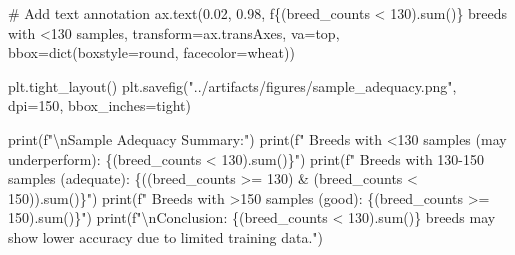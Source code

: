 \documentclass[
  letterpaper,
  DIV=11,
  numbers=noendperiod]{scrartcl}
\newenvironment{Shaded}{\begin{snugshade}}{\end{snugshade}}
\newcommand{\BuiltInTok}[1]{\textcolor[rgb]{0.00,0.23,0.31}{#1}}
\newcommand{\CharTok}[1]{\textcolor[rgb]{0.13,0.47,0.30}{#1}}
\newcommand{\CommentTok}[1]{\textcolor[rgb]{0.37,0.37,0.37}{#1}}
\newcommand{\DecValTok}[1]{\textcolor[rgb]{0.68,0.00,0.00}{#1}}
\newcommand{\FloatTok}[1]{\textcolor[rgb]{0.68,0.00,0.00}{#1}}
\newcommand{\NormalTok}[1]{\textcolor[rgb]{0.00,0.23,0.31}{#1}}
\newcommand{\OperatorTok}[1]{\textcolor[rgb]{0.37,0.37,0.37}{#1}}
\newcommand{\SpecialCharTok}[1]{\textcolor[rgb]{0.37,0.37,0.37}{#1}}
\newcommand{\SpecialStringTok}[1]{\textcolor[rgb]{0.13,0.47,0.30}{#1}}
\newcommand{\StringTok}[1]{\textcolor[rgb]{0.13,0.47,0.30}{#1}}
\renewenvironment{Shaded}{%
  \begin{tcolorbox}[%
    enhanced,%
    colback=codebg,%
    colframe=codebg,%
    borderline west={3pt}{0pt}{sectionblue},%
    boxrule=0pt,%
    arc=0pt,%
    boxsep=5pt,%
    left=2mm,%
    right=2mm,%
    top=2mm,%
    bottom=2mm%
  ]%
}{%
  \end{tcolorbox}%
}
\begin{document}
\begin{Shaded}
\begin{Highlighting}[]
\CommentTok{\# Add text annotation}
\NormalTok{ax.text(}\FloatTok{0.02}\NormalTok{, }\FloatTok{0.98}\NormalTok{, }\SpecialStringTok{f\textquotesingle{}}\SpecialCharTok{\{}\NormalTok{(breed\_counts }\OperatorTok{\textless{}} \DecValTok{130}\NormalTok{)}\SpecialCharTok{.}\BuiltInTok{sum}\NormalTok{()}\SpecialCharTok{\}}\SpecialStringTok{ breeds with \textless{}130 samples\textquotesingle{}}\NormalTok{, }
\NormalTok{        transform}\OperatorTok{=}\NormalTok{ax.transAxes, va}\OperatorTok{=}\StringTok{\textquotesingle{}top\textquotesingle{}}\NormalTok{, bbox}\OperatorTok{=}\BuiltInTok{dict}\NormalTok{(boxstyle}\OperatorTok{=}\StringTok{\textquotesingle{}round\textquotesingle{}}\NormalTok{, facecolor}\OperatorTok{=}\StringTok{\textquotesingle{}wheat\textquotesingle{}}\NormalTok{))}

\NormalTok{plt.tight\_layout()}
\NormalTok{plt.savefig(}\StringTok{"../artifacts/figures/sample\_adequacy.png"}\NormalTok{, dpi}\OperatorTok{=}\DecValTok{150}\NormalTok{, bbox\_inches}\OperatorTok{=}\StringTok{\textquotesingle{}tight\textquotesingle{}}\NormalTok{)}

\BuiltInTok{print}\NormalTok{(}\SpecialStringTok{f"}\CharTok{\textbackslash{}n}\SpecialStringTok{Sample Adequacy Summary:"}\NormalTok{)}
\BuiltInTok{print}\NormalTok{(}\SpecialStringTok{f"  Breeds with \textless{}130 samples (may underperform): }\SpecialCharTok{\{}\NormalTok{(breed\_counts }\OperatorTok{\textless{}} \DecValTok{130}\NormalTok{)}\SpecialCharTok{.}\BuiltInTok{sum}\NormalTok{()}\SpecialCharTok{\}}\SpecialStringTok{"}\NormalTok{)}
\BuiltInTok{print}\NormalTok{(}\SpecialStringTok{f"  Breeds with 130{-}150 samples (adequate): }\SpecialCharTok{\{}\NormalTok{((breed\_counts }\OperatorTok{\textgreater{}=} \DecValTok{130}\NormalTok{) }\OperatorTok{\&}\NormalTok{ (breed\_counts }\OperatorTok{\textless{}} \DecValTok{150}\NormalTok{))}\SpecialCharTok{.}\BuiltInTok{sum}\NormalTok{()}\SpecialCharTok{\}}\SpecialStringTok{"}\NormalTok{)}
\BuiltInTok{print}\NormalTok{(}\SpecialStringTok{f"  Breeds with \textgreater{}150 samples (good): }\SpecialCharTok{\{}\NormalTok{(breed\_counts }\OperatorTok{\textgreater{}=} \DecValTok{150}\NormalTok{)}\SpecialCharTok{.}\BuiltInTok{sum}\NormalTok{()}\SpecialCharTok{\}}\SpecialStringTok{"}\NormalTok{)}
\BuiltInTok{print}\NormalTok{(}\SpecialStringTok{f"}\CharTok{\textbackslash{}n}\SpecialStringTok{Conclusion: }\SpecialCharTok{\{}\NormalTok{(breed\_counts }\OperatorTok{\textless{}} \DecValTok{130}\NormalTok{)}\SpecialCharTok{.}\BuiltInTok{sum}\NormalTok{()}\SpecialCharTok{\}}\SpecialStringTok{ breeds may show lower accuracy due to limited training data."}\NormalTok{)}
\end{Highlighting}
\end{Shaded}
\end{document}
